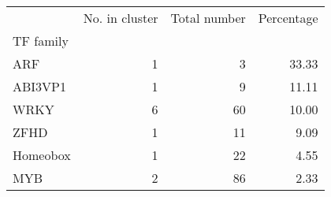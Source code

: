 \begin{tabular}{lrrr}
\toprule
{} &  No. in cluster &  Total number &  Percentage \\
TF family &                 &               &             \\
\midrule
ARF       &               1 &             3 &       33.33 \\
ABI3VP1   &               1 &             9 &       11.11 \\
WRKY      &               6 &            60 &       10.00 \\
ZFHD      &               1 &            11 &        9.09 \\
Homeobox  &               1 &            22 &        4.55 \\
MYB       &               2 &            86 &        2.33 \\
\bottomrule
\end{tabular}
